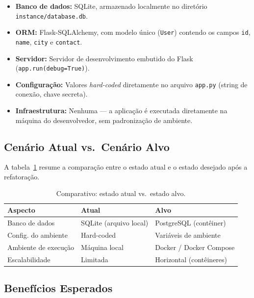 \documentclass[12pt,a4paper]{article}
\begin{document}
\begin{itemize}[nosep]
  \item \textbf{Banco de dados:} SQLite, armazenado localmente no diretório
        \texttt{instance/database.db}.
  \item \textbf{ORM:} Flask-SQLAlchemy, com modelo único (\texttt{User}) contendo os
        campos \texttt{id}, \texttt{name}, \texttt{city} e \texttt{contact}.
  \item \textbf{Servidor:} Servidor de desenvolvimento embutido do Flask
        (\texttt{app.run(debug=True)}).
  \item \textbf{Configuração:} Valores \textit{hard-coded} diretamente no arquivo
        \texttt{app.py} (string de conexão, chave secreta).
  \item \textbf{Infraestrutura:} Nenhuma — a aplicação é executada diretamente na
        máquina do desenvolvedor, sem padronização de ambiente.
\end{itemize}

\subsection{Cenário Atual vs.\ Cenário Alvo}

A tabela~\ref{tab:comparativo} resume a comparação entre o estado atual e o estado
desejado após a refatoração.

\begin{table}[h!]
  \centering
  \caption{Comparativo: estado atual vs.\ estado alvo.}
  \label{tab:comparativo}
  \begin{tabular}{lll}
    \toprule
    \textbf{Aspecto}       & \textbf{Atual}          & \textbf{Alvo} \\
    \midrule
    Banco de dados         & SQLite (arquivo local)  & PostgreSQL (contêiner) \\
    Config. do ambiente    & Hard-coded     & Variáveis de ambiente \\
    Ambiente de execução   & Máquina local           & Docker / Docker Compose \\
    Escalabilidade         & Limitada                & Horizontal (contêineres) \\
    \bottomrule
  \end{tabular}
\end{table}

\subsection{Benefícios Esperados}
\end{document}
